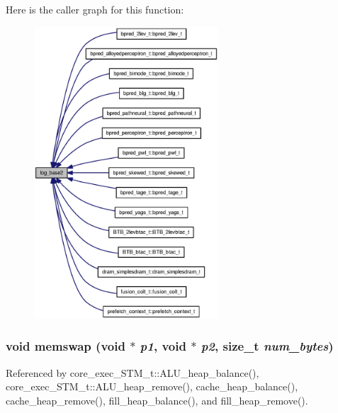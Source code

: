 Here is the caller graph for this function:\nopagebreak
\begin{figure}[H]
\begin{center}
\leavevmode
\includegraphics[width=195pt]{misc_8h_a36cd338e0176d883719b7c69ebc5670_icgraph}
\end{center}
\end{figure}
\subsubsection[{memswap}]{\setlength{\rightskip}{0pt plus 5cm}void memswap (void $\ast$ {\em p1}, \/  void $\ast$ {\em p2}, \/  size\_\-t {\em num\_\-bytes})}\label{misc_8h_e3e882464975b6a22883e91c787d8478}




Referenced by core\_\-exec\_\-STM\_\-t::ALU\_\-heap\_\-balance(), core\_\-exec\_\-STM\_\-t::ALU\_\-heap\_\-remove(), cache\_\-heap\_\-balance(), cache\_\-heap\_\-remove(), fill\_\-heap\_\-balance(), and fill\_\-heap\_\-remove().

